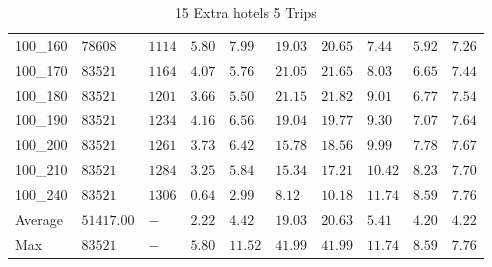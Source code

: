 \begin{center}
\begin{table}[]
\begin{adjustwidth}{-0.4in}{-1in}
\begin{tabular}{|lll|l|l|ll|lll|}
100\_160 & $78608   $  & $1114$ & $5.80$ & $7.99 $  & $19.03$    & $20.65$   & $7.44 $& $5.92$   & $7.26$ \\
100\_170 & $83521   $  & $1164$ & $4.07$ & $5.76 $  & $21.05$    & $21.65$   & $8.03 $& $6.65$   & $7.44$ \\
100\_180 & $83521   $  & $1201$ & $3.66$ & $5.50 $  & $21.15$    & $21.82$   & $9.01 $& $6.77$   & $7.54$ \\
100\_190 & $83521   $  & $1234$ & $4.16$ & $6.56 $  & $19.04$    & $19.77$   & $9.30 $& $7.07$   & $7.64$ \\
100\_200 & $83521   $  & $1261$ & $3.73$ & $6.42 $  & $15.78$    & $18.56$   & $9.99 $& $7.78$   & $7.67$ \\
100\_210 & $83521   $  & $1284$ & $3.25$ & $5.84 $  & $15.34$    & $17.21$   & $10.42$& $8.23$   & $7.70$ \\
100\_240 & $83521   $  & $1306$ & $0.64$ & $2.99 $  & $8.12$    & $10.18$   & $11.74$& $8.59$   & $7.76$ \\
\hline
Average  & $51417.00$  & $-   $ & $2.22$ & $4.42 $  & $19.03$    & $20.63$   & $5.41 $& $4.20$   & $4.22$ \\
Max      & $83521   $  & $-   $ & $5.80$ & $11.52$  & $41.99$    & $41.99$   & $11.74$& $8.59$   & $7.76$ \\
\hline
\end{tabular}
    \end{adjustwidth}
    \caption{15 Extra hotels 5 Trips}
    \label{15-5}
    \end{table}
\end{center}
